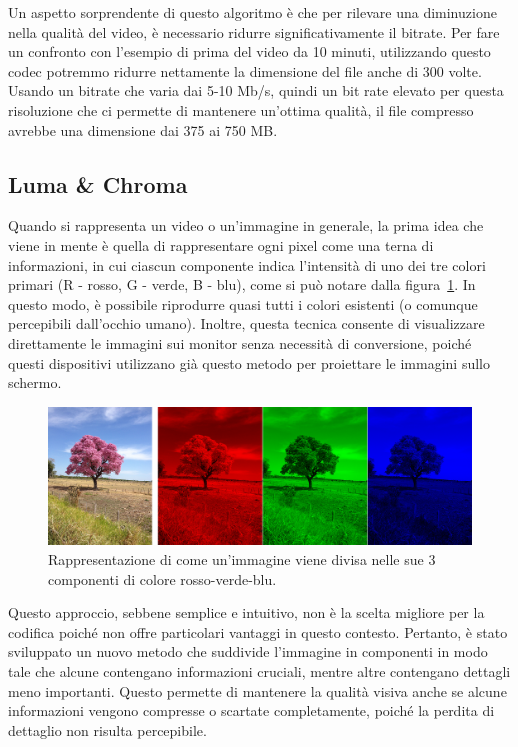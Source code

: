 \documentclass[a4paper,12pt, oneside]{article}
\begin{document}
\noindent Un aspetto sorprendente di questo algoritmo è che per rilevare una diminuzione nella qualità
del video, è necessario ridurre significativamente il bitrate. Per fare un confronto con l'esempio di
prima del video da 10 minuti, utilizzando questo codec potremmo ridurre nettamente la dimensione del
file anche di 300 volte. Usando un bitrate che varia dai 5-10 Mb/s, quindi un bit rate elevato per
questa risoluzione che ci permette di mantenere un'ottima qualità, il file compresso avrebbe una
dimensione dai 375 ai 750 MB.

\subsection{Luma \& Chroma}
Quando si rappresenta un video o un'immagine in generale, la prima idea che viene in mente è quella di
rappresentare ogni pixel come una terna di informazioni, in cui ciascun componente indica l'intensità
di uno dei tre colori primari (R - rosso, G - verde, B - blu), come si può notare dalla
figura~\ref{fig:n_rgb}. In questo modo, è possibile riprodurre quasi tutti i colori esistenti (o
comunque percepibili dall'occhio umano). Inoltre, questa tecnica consente di visualizzare direttamente
le immagini sui monitor senza necessità di conversione, poiché questi dispositivi utilizzano già questo
metodo per proiettare le immagini sullo schermo.

\begin{figure}[h]
    \centering
    \includegraphics[width=1\textwidth]{images/n-rgb.png}
    \caption{Rappresentazione di come un'immagine viene divisa nelle sue 3 componenti di colore rosso-verde-blu.}
    \label{fig:n_rgb}
\end{figure}

Questo approccio, sebbene semplice e intuitivo, non è la scelta migliore per la codifica poiché non
offre particolari vantaggi in questo contesto. Pertanto, è stato sviluppato un nuovo metodo che
suddivide l'immagine in componenti in modo tale che alcune contengano informazioni cruciali, mentre
altre contengano dettagli meno importanti. Questo permette di mantenere la qualità visiva anche se
alcune informazioni vengono compresse o scartate completamente, poiché la perdita di dettaglio non
risulta percepibile.
\end{document}
